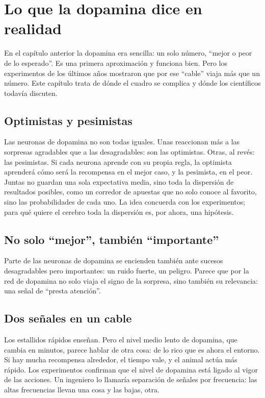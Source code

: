 \chapter{Lo que la dopamina dice en realidad}

En el capítulo anterior la dopamina era sencilla: un solo número, “mejor o peor de lo esperado”. Es una primera aproximación y funciona bien. Pero los experimentos de los últimos años mostraron que por ese “cable” viaja más que un número. Este capítulo trata de dónde el cuadro se complica y dónde los científicos todavía discuten.

\section*{Optimistas y pesimistas}

Las neuronas de dopamina no son todas iguales. Unas reaccionan más a las sorpresas agradables que a las desagradables: son las optimistas. Otras, al revés: las pesimistas. Si cada neurona aprende con su propia regla, la optimista aprenderá cómo será la recompensa en el mejor caso, y la pesimista, en el peor. Juntas no guardan una sola expectativa media, sino toda la dispersión de resultados posibles, como un corredor de apuestas que no solo conoce al favorito, sino las probabilidades de cada uno. La idea concuerda con los experimentos; para qué quiere el cerebro toda la dispersión es, por ahora, una hipótesis.


\section*{No solo “mejor”, también “importante”}

Parte de las neuronas de dopamina se encienden también ante sucesos desagradables pero importantes: un ruido fuerte, un peligro. Parece que por la red de dopamina no solo viaja el signo de la sorpresa, sino también su relevancia: una señal de “presta atención”.

\section*{Dos señales en un cable}

Los estallidos rápidos enseñan. Pero el nivel medio lento de dopamina, que cambia en minutos, parece hablar de otra cosa: de lo rico que es ahora el entorno. Si hay mucha recompensa alrededor, el tiempo vale, y el animal actúa más rápido. Los experimentos confirman que el nivel de dopamina está ligado al vigor de las acciones. Un ingeniero lo llamaría separación de señales por frecuencia: las altas frecuencias llevan una cosa y las bajas, otra.

